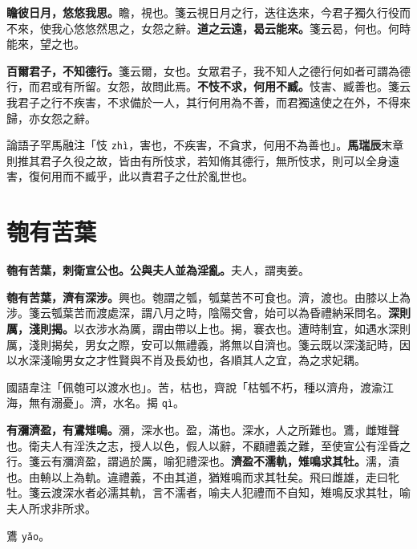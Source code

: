 \textbf{瞻彼日月，悠悠我思。}{\footnotesize 瞻，視也。箋云視日月之行，迭往迭來，今君子獨久行役而不來，使我心悠悠然思之，女怨之辭。}\textbf{道之云遠，曷云能來。}{\footnotesize 箋云曷，何也。何時能來，望之也。}

\textbf{百爾君子，不知德行。}{\footnotesize 箋云爾，女也。女眾君子，我不知人之德行何如者可謂為德行，而君或有所留。女怨，故問此焉。}\textbf{不忮不求，何用不臧。}{\footnotesize 忮害、臧善也。箋云我君子之行不疾害，不求備於一人，其行何用為不善，而君獨遠使之在外，不得來歸，亦女怨之辭。}

\begin{quoting}論語子罕馬融注「忮 \texttt{zhì}，害也，不疾害，不貪求，何用不為善也」。\textbf{馬瑞辰}末章則推其君子久役之故，皆由有所忮求，若知脩其德行，無所忮求，則可以全身遠害，復何用而不臧乎，此以責君子之仕於亂世也。\end{quoting}

\section{匏有苦葉}


\textbf{匏有苦葉，刺衛宣公也。公與夫人並為淫亂。}{\footnotesize 夫人，謂夷姜。}

\textbf{匏有苦葉，濟有深涉。}{\footnotesize 興也。匏謂之瓠，瓠葉苦不可食也。濟，渡也。由膝以上為涉。箋云瓠葉苦而渡處深，謂八月之時，陰陽交會，始可以為昏禮納采問名。}\textbf{深則厲，淺則揭。}{\footnotesize 以衣涉水為厲，謂由帶以上也。揭，褰衣也。遭時制宜，如遇水深則厲，淺則揭矣，男女之際，安可以無禮義，將無以自濟也。箋云既以深淺記時，因以水深淺喻男女之才性賢與不肖及長幼也，各順其人之宜，為之求妃耦。}

\begin{quoting}國語韋注「佩匏可以渡水也」。苦，枯也，齊說「枯瓠不朽，種以濟舟，渡渝江海，無有溺憂」。濟，水名。揭 \texttt{qì}。\end{quoting}

\textbf{有瀰濟盈，有鷕雉鳴。}{\footnotesize 瀰，深水也。盈，滿也。深水，人之所難也。鷕，雌雉聲也。衛夫人有淫泆之志，授人以色，假人以辭，不顧禮義之難，至使宣公有淫昏之行。箋云有瀰濟盈，謂過於厲，喻犯禮深也。}\textbf{濟盈不濡軌，雉鳴求其牡。}{\footnotesize 濡，漬也。由輈以上為軌。違禮義，不由其道，猶雉鳴而求其牡矣。飛曰雌雄，走曰牝牡。箋云渡深水者必濡其軌，言不濡者，喻夫人犯禮而不自知，雉鳴反求其牡，喻夫人所求非所求。}

\begin{quoting}鷕 \texttt{yǎo}。\end{quoting}


